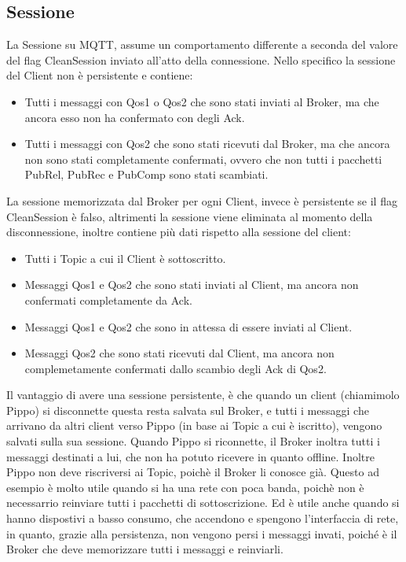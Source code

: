 \documentclass{article}
\begin{document}
\subsection{Sessione}
La Sessione su MQTT, assume un comportamento differente a seconda del valore del flag CleanSession inviato all'atto della connessione. Nello specifico la sessione del Client non è persistente e contiene:
\begin{itemize}
	\item Tutti i messaggi con Qos1 o Qos2 che sono stati inviati al Broker, ma che ancora esso non ha confermato con degli Ack.
	\item Tutti i messaggi con Qos2 che sono stati ricevuti dal Broker, ma che ancora non sono stati completamente confermati, ovvero che non tutti i pacchetti PubRel, PubRec e PubComp sono stati scambiati.
\end{itemize}
La sessione memorizzata dal Broker per ogni Client, invece è persistente se il flag CleanSession è falso, altrimenti la sessione viene eliminata al momento della disconnessione, inoltre contiene più dati rispetto alla sessione del client:
\begin{itemize}
	\item Tutti i Topic a cui il Client è sottoscritto.
	\item Messaggi Qos1 e Qos2 che sono stati inviati al Client, ma ancora non confermati completamente da Ack.
	\item Messaggi Qos1 e Qos2 che sono in attessa di essere inviati al Client.
	\item Messaggi Qos2 che sono stati ricevuti dal Client, ma ancora non complemetamente confermati dallo scambio degli Ack di Qos2.
\end{itemize}
Il vantaggio di avere una sessione persistente, è che quando un client (chiamimolo Pippo) si disconnette questa resta salvata sul Broker, e tutti i messaggi che arrivano da altri client verso Pippo (in base ai Topic a cui è iscritto), vengono salvati sulla sua sessione. Quando Pippo si riconnette, il Broker inoltra tutti i messaggi destinati a lui, che non ha potuto ricevere in quanto offline. Inoltre Pippo non deve riscriversi ai Topic, poichè il Broker li conosce già. Questo ad esempio è molto utile quando si ha una rete con poca banda, poichè non è necessarrio reinviare tutti i pacchetti di sottoscrizione. Ed è utile anche quando si hanno dispostivi a basso consumo, che accendono e spengono l'interfaccia di rete, in quanto, grazie alla persistenza, non vengono persi i messaggi invati, poiché è il Broker che deve memorizzare tutti i messaggi e reinviarli.
\end{document}
